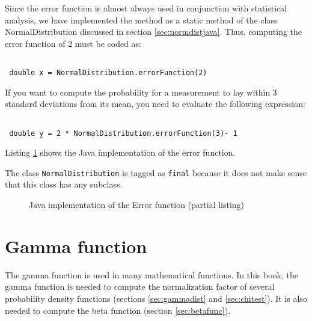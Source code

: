 \documentclass[twoside]{book}
\begin{document}
Since the error function is almost always used in conjunction with
statistical analysis, we have implemented the method as a static
method of the class NormalDistribution discussed in section
\ref{sec:normdistjava}. Thus, computing the error function of 2
must be coded as:
\begin{codeExample}
\begin{verbatim}

 double x = NormalDistribution.errorFunction(2)
\end{verbatim}
\end{codeExample}
If you want to compute the probability for a measurement to lay
within 3 standard deviations from its mean, you need to evaluate
the following expression:
\begin{codeExample}
\begin{verbatim}

 double y = 2 * NormalDistribution.errorFunction(3)- 1
\end{verbatim}
\end{codeExample}
Listing \ref{lj:errorFunction} shows the Java implementation of
the error function.

The class {\tt NormalDistribution} is tagged as {\tt final}
because it does not make sense that this class has any subclass.

\begin{figure}
\begin{listing}
\caption{Java implementation of the Error function (partial
listing)}
\label{lj:errorFunction}

\end{listing}
\end{figure}

\section{Gamma function}
The gamma function is used in many mathematical functions. In this
book, the gamma function is needed to compute the normalization
factor of several probability density functions (\cf sections
\ref{sec:gammadist} and \ref{sec:chitest}). It is also needed to
compute the beta function (\cf section \ref{sec:betafunc}).
\end{document}
